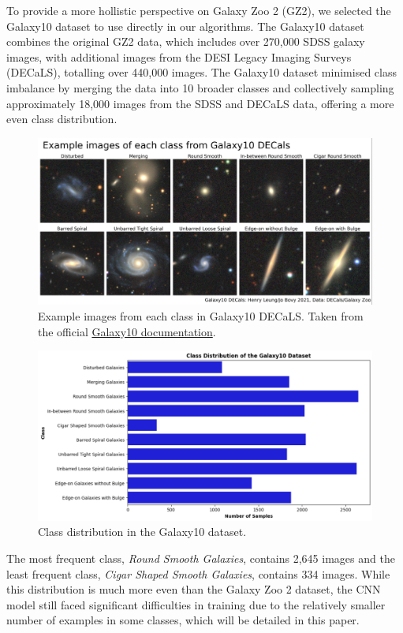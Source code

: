 \documentclass[10pt,twocolumn,letterpaper]{article}
\begin{document}
To provide a more hollistic perspective on Galaxy Zoo 2 (GZ2), we selected the Galaxy10 dataset to use directly in our algorithms.
The Galaxy10 dataset combines the original GZ2 data, which includes over 270,000 SDSS galaxy images, with additional images from the DESI Legacy Imaging Surveys (DECaLS), totalling over 440,000 images.
The Galaxy10 dataset minimised class imbalance by merging the data into 10 broader classes and collectively sampling approximately 18,000 images from the SDSS and DECaLS data, offering a more even class distribution.
\begin{figure}[htbp]
    \includegraphics[width=\linewidth]{galaxy10_images.png}
    \caption{Example images from each class in Galaxy10 DECaLS. Taken from the official \href{https://astronn.readthedocs.io/en/latest/galaxy10.html}{Galaxy10 documentation}.}
    \label{fig:galaxyimgs}
  \end{figure}
  \begin{figure}[htbp]
    \includegraphics[width=\linewidth]{galaxy_distribution2.png}
    \caption{Class distribution in the Galaxy10 dataset.}
    \label{fig:featuredist2}
  \end{figure}

  \noindent The most frequent class, \textit{Round Smooth Galaxies}, contains 2,645 images and the least frequent class, \textit{Cigar Shaped Smooth Galaxies}, contains 334 images.
While this distribution is much more even than the Galaxy Zoo 2 dataset, the CNN model still faced significant difficulties in training due to the relatively smaller number of examples in some classes, which will be detailed in this paper.
\end{document}
